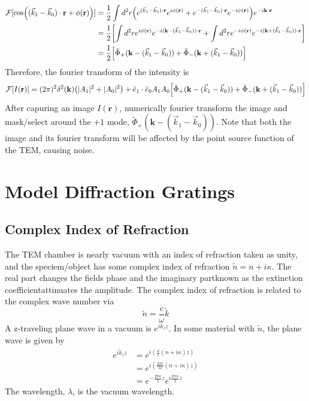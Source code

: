 \documentclass[12pt]{article}
\begin{document}
\begin{align}
    \mathcal{F}[\cos((\vec{k}_1 - \vec{k}_0)\cdot \mathbf{r} + \phi(\mathbf{r}))] 
    &= \frac{1}{2}\int d^2r 
        \qty(e^{(\vec{k}_1 - \vec{k}_0)\cdot \mathbf{r}} e^{i\phi(\mathbf{r})} + 
        e^{-(\vec{k}_1 - \vec{k}_0)\cdot \mathbf{r}} e^{-i\phi(\mathbf{r})}) 
        e^{-i\mathbf{k}\cdot \mathbf{r}}\\
    &= \frac{1}{2}
        \qty[\int d^2r e^{i\phi(\mathbf{r})}    e^{-i(\mathbf{k} - (\vec{k}_1 - \vec{k}_0))\cdot \mathbf{r}} + 
        \int d^2r e^{-i\phi(\mathbf{r})}     e^{-i(\mathbf{k} + (\vec{k}_1 - \vec{k}_0))\cdot \mathbf{r}} ]\\
    &= \frac{1}{2} \qty[
        \tilde{\Phi}_+ (\mathbf{k} - (\vec{k}_1 - \vec{k}_0)) + 
        \tilde{\Phi}_- (\mathbf{k} + (\vec{k}_1 - \vec{k}_0))]
\end{align}
Therefore, the fourier transform of the intensity is
\begin{equation}
    \mathcal{F}[I(\mathbf{r})] = (2\pi)^2 \delta^2(\mathbf{k})\qty(|A_1|^2 + |A_0|^2) + 
    \hat{e}_{1}\cdot \hat{e}_{0}     A_1A_0 
    \qty[\tilde{\Phi}_+ (\mathbf{k} - (\vec{k}_1 - \vec{k}_0)) + 
    \tilde{\Phi}_- (\mathbf{k} + (\vec{k}_1 - \vec{k}_0))]
\end{equation}
After capuring an image $I(\mathbf{r})$, numerically fourier transform the image and mask/select around 
the $+1$ mode, $\tilde{\Phi}_+ (\mathbf{k} - (\vec{k}_1 - \vec{k}_0))$. Note that both the image and its fourier transform 
will be affected by the point source function of the TEM, causing noise.

\section{Model Diffraction Gratings}
\subsection{Complex Index of Refraction}
The TEM chamber is nearly vacuum with an index of refraction taken as unity, 
and the speciem/object has some complex index of refraction $\tilde{n} = n + i\kappa$.
The real part changes the fields phase and the imaginary part\textemdash known as the 
extinction coefficient\textemdash attinuates the amplitude. The complex index of refraction 
is related to the complex wave number via
\begin{equation*}
    \boxed{\tilde{n} = \frac{c}{\omega} \tilde{k}}
\end{equation*}
A z-traveling plane wave in a vacuum is $e^{ik_z z}$. In some material with $\tilde{n}$, 
the plane wave is given by
\begin{align*}
    e^{i\tilde{k}_z z} &= e^{i(\frac{\omega}{c}(n + i\kappa)z)}\\
    &= e^{i(\frac{2\pi c}{\lambda c}(n + i\kappa)z)}\\
    &= e^{-\frac{2\pi \kappa}{\lambda}z}e^{i\frac{2\pi n}{\lambda}z}
\end{align*}
The wavelength, $\lambda$, is the vacuum wavelength.
\end{document}
